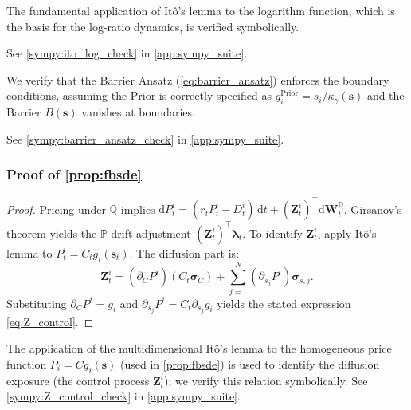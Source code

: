 \documentclass[11pt,letterpaper,oneside]{article}
\numberwithin{equation}{section}
\newcommand{\1}{\mathbf{1}}
\newcommand{\diff}{\mathrm{d}}
\begin{document}
\begin{sympycheck}[title={Verification: It\^o's Lemma for Logarithm (\cref{lem:log_ratios} basis)}]\label{sympy:ito_log}
The fundamental application of It\^o's lemma to the logarithm function, which is the basis for the log-ratio dynamics, is verified symbolically.

See \cref{sympy:ito_log_check} in \cref{app:sympy_suite}.\end{sympycheck}
\begin{sympycheck}[title={Verification: Boundary Enforcement by Barrier Ansatz (\cref{sec:computation:stabilization})}]\label{sympy:barrier_ansatz}
We verify that the Barrier Ansatz (\cref{eq:barrier_ansatz}) enforces the boundary conditions, assuming the Prior is correctly specified as $g_i^{\text{Prior}} = s_i/\kappa_\gamma(\bm{s})$ and the Barrier $B(\bm{s})$ vanishes at boundaries.

See \cref{sympy:barrier_ansatz_check} in \cref{app:sympy_suite}.\end{sympycheck}


\subsubsection{Proof of \cref{prop:fbsde}}\label{app:proof:prop:fbsde}
\begin{proof}
Pricing under $\mathbb{Q}$ implies $\diff P_t^i = (r_t P_t^i - D_t^i)\,\diff t + (\bm{Z}_t^i)^{\top}\diff\bm{W}_t^{\mathbb{Q}}$. Girsanov's theorem yields the $\mathbb{P}$-drift adjustment $(\bm{Z}_t^i)^{\top}\bm{\lambda}_t$.
To identify $\bm{Z}_t^i$, apply It\^o's lemma to $P_t^i=C_t g_i(\bm{s}_t)$. The diffusion part is:
\[
  \bm{Z}_t^i = (\partial_C P^i) (C_t\bm{\sigma}_C) + \sum_{j=1}^N (\partial_{s_j} P^i) \bm{\sigma}_{s,j}.
\]
Substituting $\partial_C P^i = g_i$ and $\partial_{s_j} P^i = C_t \partial_{s_j} g_i$ yields the stated expression \eqref{eq:Z_control}.
\end{proof}

\begin{sympycheck}[title={Verification: Structure of the Control Process $\bm{Z}_t^i$ (\cref{prop:fbsde})}]\label{sympy:Z_control}
The application of the multidimensional It\^o's lemma to the homogeneous price function $P_i = C g_i(\bm{s})$ (used in \cref{prop:fbsde}) is used to identify the diffusion exposure (the control process $\bm{Z}_t^i$); we verify this relation symbolically.
See \cref{sympy:Z_control_check} in \cref{app:sympy_suite}.
\end{sympycheck}
\end{document}

